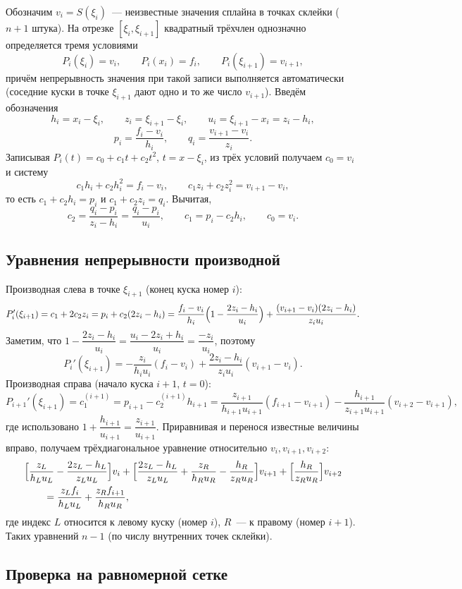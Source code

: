 \documentclass[11pt,a4paper]{report}
\begin{document}
Обозначим $v_i=S(\xi_i)$~--- неизвестные значения сплайна в точках склейки
($n+1$ штука). На отрезке $[\xi_i,\xi_{i+1}]$ квадратный трёхчлен однозначно
определяется тремя условиями
\[
P_i(\xi_i)=v_i,\qquad P_i(x_i)=f_i,\qquad P_i(\xi_{i+1})=v_{i+1},
\]
причём непрерывность значения при такой записи выполняется автоматически
(соседние куски в точке $\xi_{i+1}$ дают одно и то же число $v_{i+1}$).
Введём обозначения
\[
h_i=x_i-\xi_i,\qquad z_i=\xi_{i+1}-\xi_i,\qquad u_i=\xi_{i+1}-x_i=z_i-h_i,
\]
\[
p_i=\frac{f_i-v_i}{h_i},\qquad q_i=\frac{v_{i+1}-v_i}{z_i}.
\]
Записывая $P_i(t)=c_0+c_1t+c_2t^2$, $t=x-\xi_i$, из трёх условий получаем
$c_0=v_i$ и систему
\[
c_1h_i+c_2h_i^2=f_i-v_i,\qquad c_1z_i+c_2z_i^2=v_{i+1}-v_i,
\]
то есть $c_1+c_2h_i=p_i$ и $c_1+c_2z_i=q_i$. Вычитая,
\[
\boxed{\;c_2=\frac{q_i-p_i}{z_i-h_i}=\frac{q_i-p_i}{u_i},\qquad
c_1=p_i-c_2h_i,\qquad c_0=v_i.\;}
\]

\subsection{Уравнения непрерывности производной}

Производная слева в точке $\xi_{i+1}$ (конец куска номер $i$):
\[
P_i'(\xi_{i+1})=c_1+2c_2z_i=p_i+c_2(2z_i-h_i)
=\frac{f_i-v_i}{h_i}\Bigl(1-\frac{2z_i-h_i}{u_i}\Bigr)
+\frac{(v_{i+1}-v_i)(2z_i-h_i)}{z_iu_i}.
\]
Заметим, что
$1-\dfrac{2z_i-h_i}{u_i}=\dfrac{u_i-2z_i+h_i}{u_i}=\dfrac{-z_i}{u_i}$,
поэтому
\[
P_i'(\xi_{i+1})=-\frac{z_i}{h_iu_i}(f_i-v_i)+\frac{2z_i-h_i}{z_iu_i}(v_{i+1}-v_i).
\]
Производная справа (начало куска $i+1$, $t=0$):
\[
P_{i+1}'(\xi_{i+1})=c_1^{(i+1)}=p_{i+1}-c_2^{(i+1)}h_{i+1}
=\frac{z_{i+1}}{h_{i+1}u_{i+1}}(f_{i+1}-v_{i+1})
-\frac{h_{i+1}}{z_{i+1}u_{i+1}}(v_{i+2}-v_{i+1}),
\]
где использовано $1+\dfrac{h_{i+1}}{u_{i+1}}=\dfrac{z_{i+1}}{u_{i+1}}$.
Приравнивая и перенося известные величины вправо, получаем трёхдиагональное
уравнение относительно $v_i,v_{i+1},v_{i+2}$:
\[
\begin{aligned}
&\Bigl[\frac{z_L}{h_Lu_L}-\frac{2z_L-h_L}{z_Lu_L}\Bigr]v_i
+\Bigl[\frac{2z_L-h_L}{z_Lu_L}+\frac{z_R}{h_Ru_R}-\frac{h_R}{z_Ru_R}\Bigr]v_{i+1}
+\Bigl[\frac{h_R}{z_Ru_R}\Bigr]v_{i+2}\\
&\qquad=\frac{z_Lf_i}{h_Lu_L}+\frac{z_Rf_{i+1}}{h_Ru_R},
\end{aligned}
\]
где индекс $L$ относится к левому куску (номер $i$), $R$~--- к правому
(номер $i+1$). Таких уравнений $n-1$ (по числу внутренних точек склейки).

\subsection{Проверка на равномерной сетке}
\end{document}
